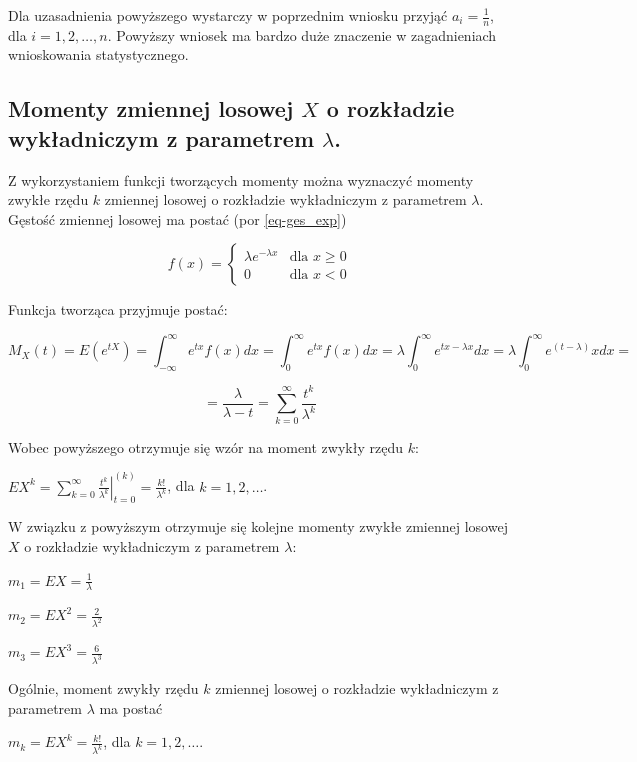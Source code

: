\documentclass[
  letterpaper,
  DIV=11,
  numbers=noendperiod]{scrreprt}
\begin{document}
Dla uzasadnienia powyższego wystarczy w poprzednim wniosku przyjąć
\(a_i=\frac{1}{n}\), dla \(i = 1, 2, \ldots, n.\) Powyższy wniosek ma
bardzo duże znaczenie w zagadnieniach wnioskowania statystycznego.

\subsection{\texorpdfstring{Momenty zmiennej losowej \(X\) o rozkładzie
wykładniczym z parametrem
\(\lambda\).}{Momenty zmiennej losowej X o rozkładzie wykładniczym z parametrem \textbackslash lambda.}}\label{momenty-zmiennej-losowej-x-o-rozkux142adzie-wykux142adniczym-z-parametrem-lambda.}

Z wykorzystaniem funkcji tworzących momenty można wyznaczyć momenty
zwykłe rzędu \(k\) zmiennej losowej o rozkładzie wykładniczym z
parametrem \(\lambda\). Gęstość zmiennej losowej ma postać (por
\ref{eq-ges_exp})

\[
f(x) = \begin{cases} 
\lambda e^{-\lambda x} & \text{dla } x \ge 0 \\
0 & \text{dla } x <0 
\end{cases}
\]

Funkcja tworząca przyjmuje postać:

\[M_X(t) = E(e^{tX})=\int_{-\infty}^{\infty}e^{tx}f(x)dx=\int_0^{\infty}e^{tx}f(x)dx=\lambda \int_0^{\infty}e^{tx-\lambda x}dx = \lambda \int_0^{\infty}e^{(t-\lambda)} xdx=\]

\[=\frac{ \lambda}{\lambda-t}= \sum_{k=0}^{\infty} \frac{t^k}{\lambda ^k}\]

Wobec powyższego otrzymuje się wzór na moment zwykły rzędu \(k\):

\(EX^k=\left.\sum_{k=0}^{\infty} \frac{t^k}{\lambda^k} \right|_{t=0}^{(k)} = \frac{k!}{\lambda^k}\),
dla \(k = 1, 2, \ldots\).

W związku z powyższym otrzymuje się kolejne momenty zwykłe zmiennej
losowej \(X\) o rozkładzie wykładniczym z parametrem \(\lambda\):

\(m_1 = EX =  \frac{1}{\lambda}\)

\(m_2 = EX^2 =  \frac{2}{\lambda^2}\)

\(m_3 = EX^3 =  \frac{6}{\lambda^3}\)

Ogólnie, moment zwykły rzędu \(k\) zmiennej losowej o rozkładzie
wykładniczym z parametrem \(\lambda\) ma postać

\(m_k = EX^k =  \frac{k!}{\lambda^k}\), dla \(k = 1, 2, \ldots\).
\end{document}
